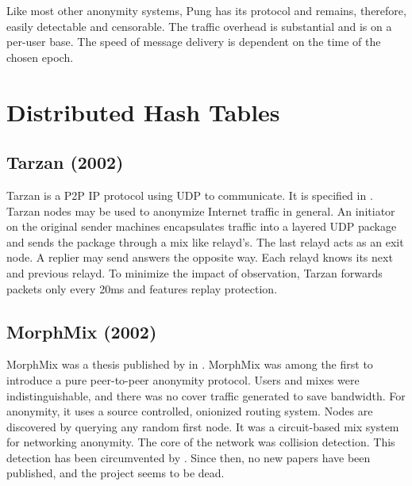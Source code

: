 Like most other anonymity systems, Pung has its protocol and remains, therefore, easily detectable and censorable. The traffic overhead is substantial and is on a per-user base. The speed of message delivery is dependent on the time of the chosen epoch.

%

\section{Distributed Hash Tables}
\subsection{Tarzan (2002)}
Tarzan is a P2P IP protocol using UDP to communicate. It is specified in \cite{tarzan:ccs02}. Tarzan nodes may be used to anonymize Internet traffic in general. An initiator on the original sender machines encapsulates traffic into a layered UDP package and sends the package through a mix like relayd's. The last relayd acts as an exit node. A replier may send answers the opposite way. Each relayd knows its next and previous relayd. To minimize the impact of observation, Tarzan forwards packets only every 20ms and features replay protection.

\subsection{MorphMix (2002)}
MorphMix was a thesis published by \citeauthor{morphmix:wpes2002} in \cite{morphmix:wpes2002}. MorphMix was among the first to introduce a pure peer-to-peer anonymity protocol. Users and mixes were indistinguishable, and there was no cover traffic generated to save bandwidth. For anonymity, it uses a source controlled, onionized routing system. Nodes are discovered by querying any random first node. It was a circuit-based mix system for networking anonymity. The core of the network was collision detection. This detection has been circumvented by \cite{morphmix:pet2006}. Since then, no new papers have been published, and the project seems to be dead.

